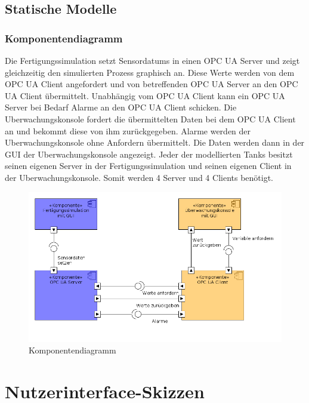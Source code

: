 \documentclass[parskip=full]{scrartcl}
\begin{document}
\subsection{Statische Modelle}
\subsubsection{Komponentendiagramm}
Die \gls{Fertigungssimulation} setzt \glspl{Sensordatum} in einen \gls{OPC UA Server} und zeigt
gleichzeitig den simulierten Prozess graphisch an. Diese Werte werden von dem \gls{OPC UA Client} angefordert
und von betreffenden \gls{OPC UA Server} an den \gls{OPC UA Client} übermittelt. Unabhängig vom \gls{OPC UA Client}
kann ein \gls{OPC UA Server} bei Bedarf Alarme an den \gls{OPC UA Client} schicken.
Die \gls{Uberwachungskonsole} fordert die übermittelten Daten bei dem \gls{OPC UA Client} an und bekommt
diese von ihm zurückgegeben. Alarme werden der \gls{Uberwachungskonsole} ohne Anfordern übermittelt.
Die Daten werden dann in der \gls{GUI} der \gls{Uberwachungskonsole} angezeigt. Jeder der modellierten Tanks
besitzt seinen eigenen Server in der \gls{Fertigungssimulation} und seinen eigenen Client in der \gls{Uberwachungskonsole}.
Somit werden 4 Server und 4 Clients benötigt.
\begin{figure}[h!]
  \centering
  \includegraphics[scale=0.5]{media/ComponentDiagram/componentDiagram.png}
  \caption{Komponentendiagramm}
\end{figure}

\section{Nutzerinterface-Skizzen}
\end{document}
